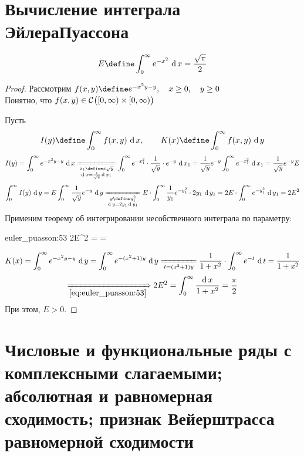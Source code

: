 \section{Вычисление интеграла ЭйлераПуассона}

\begin{theorem}
	$$ E \define \dint0\infty{e^{-x^2}} = \frac{\sqrt\pi}2 $$
\end{theorem}

\begin{proof}
	Рассмотрим $ f(x, y) \define e^{-x^2y - y}, \quad x \ge 0, \quad y \ge 0 $ \\
	Понятно, что $ f(x, y) \in \mathcal{C}^{} \big( {[0, \infty) \times [0, \infty)} \big)  $

	Пусть
	$$ I(y) \define \dint0\infty{f(x, y)}, \qquad K(x) \define \dint[y]0\infty{f(x, y)} $$
	$$ I(y) = \dint0\infty{e^{-x^2y - y}} \undereq{
		\begin{subarray}c
			x_1 \define x\sqrt y \\
			\di x = \frac1{\sqrt y}\di x_1
		\end{subarray}} \dint[x_1]0\infty{e^{-x_1^2} \cdot \frac1{\sqrt y} \cdot e^{-y}} = \frac1{\sqrt y} e^{-y} \dint[x_1]0\infty{e^{-x_1^2}} = \frac1{\sqrt y}e^{-y}E $$
	$$ \dint[y]0\infty{I(y)} = E \dint[y]0\infty{\frac1{\sqrt y}e^{-y}} \undereq{
		\begin{subarray}c
			y \define y_1^2 \\
			\di y = 2y_1\di y_1
		\end{subarray}} E \cdot \dint[y_1]0\infty{\frac1{y_1}e^{-y_1^2} \cdot 2y_1} = 2E \cdot \dint[y_1]0\infty{e^{-y_1^2}} = 2E^2 $$
	Применим теорему об интегрировании несобственного интеграла по параметру:
	\begin{equ}{euler_puasson:53}
		\implies 2E^2 =  = 
	\end{equ}
	$$ K(x) = \dint[y]0\infty{e^{-x^2y - y}} = \dint[y]0\infty{e^{-(x^2 + 1)y}} \undereq{t = (x^2 + 1)y} \frac1{1 + x^2} \cdot \dint[t]0\infty{e^{-t}} = \frac1{1 + x^2} $$
	$$ \underimp{\eref{euler_puasson:53}} 2E^2 = \dfint0\infty{1 + x^2} = \frac\pi2 $$
	При этом, $ E > 0 $.
\end{proof}

\section{Числовые и функциональные ряды с комплексными слагаемыми; абсолютная и равномерная сходимость; признак Вейерштрасса равномерной сходимости}

